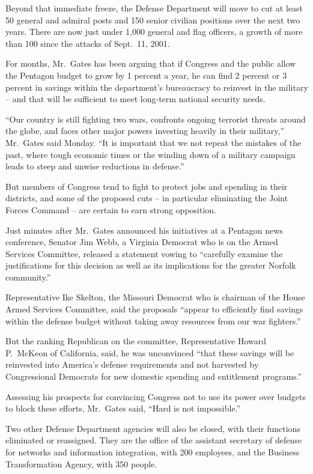 ﻿\documentclass[12pt]{article}
\begin{document}
Beyond that immediate freeze, the Defense Department will move to cut at least 50 general and
admiral posts and 150 senior civilian positions over the next two years. There are now just under
1,000 general and flag officers, a growth of more than 100 since the attacks of Sept.~11, 2001.

For months, Mr.~Gates has been arguing that if Congress and the public allow the Pentagon budget to
grow by 1 percent a year, he can find 2 percent or 3 percent in savings within the department's
bureaucracy to reinvest in the military -- and that will be sufficient to meet long-term national
security needs.

``Our country is still fighting two wars, confronts ongoing terrorist threats around the globe, and
faces other major powers investing heavily in their military,'' Mr.~Gates said Monday. ``It is
important that we not repeat the mistakes of the past, where tough economic times or the winding
down of a military campaign leads to steep and unwise reductions in defense.''

But members of Congress tend to fight to protect jobs and spending in their districts, and some of
the proposed cuts -- in particular eliminating the Joint Forces Command -- are certain to earn
strong opposition.

Just minutes after Mr.~Gates announced his initiatives at a Pentagon news conference, Senator Jim
Webb, a Virginia Democrat who is on the Armed Services Committee, released a statement vowing to
``carefully examine the justifications for this decision as well as its implications for the greater
Norfolk community.''

Representative Ike Skelton, the Missouri Democrat who is chairman of the House Armed Services
Committee, said the proposals ``appear to efficiently find savings within the defense budget without
taking away resources from our war fighters.''

But the ranking Republican on the committee, Representative Howard P.~McKeon of California, said, he
was unconvinced ``that these savings will be reinvested into America's defense requirements and not
harvested by Congressional Democrats for new domestic spending and entitlement programs.''

Assessing his prospects for convincing Congress not to use its power over budgets to block these
efforts, Mr.~Gates said, ``Hard is not impossible.''

Two other Defense Department agencies will also be closed, with their functions eliminated or
reassigned. They are the office of the assistant secretary of defense for networks and information
integration, with 200 employees, and the Business Transformation Agency, with 350 people.
\end{document}
